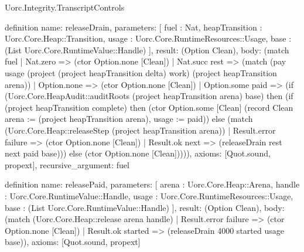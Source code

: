 \begin{lexlean}{Uorc.Integrity.TranscriptControls}
\begin{semanticmodule}
definition{
  name: releaseDrain,
  parameters: [
    fuel : Nat,
    heapTransition : Uorc.Core.Heap::Transition,
    usage : Uorc.Core.RuntimeResources::Usage,
    base : (List Uorc.Core.RuntimeValue::Handle)
  ],
  result: (Option Clean),
  body: (match fuel
    | Nat.zero => (ctor Option.none [Clean])
    | Nat.succ rest => (match (pay usage (project (project heapTransition delta) work) (project heapTransition arena))
      | Option.none => (ctor Option.none [Clean])
      | Option.some paid => (if (Uorc.Core.HeapAudit::auditRoots (project heapTransition arena) base) then (if (project heapTransition complete) then (ctor Option.some [Clean] (record Clean {arena := (project heapTransition arena), usage := paid})) else (match (Uorc.Core.Heap::releaseStep (project heapTransition arena))
        | Result.error failure => (ctor Option.none [Clean])
        | Result.ok next => (releaseDrain rest next paid base))) else (ctor Option.none [Clean])))),
  axioms: [Quot.sound, propext],
  recursive_argument: fuel
}

definition{
  name: releasePaid,
  parameters: [
    arena : Uorc.Core.Heap::Arena,
    handle : Uorc.Core.RuntimeValue::Handle,
    usage : Uorc.Core.RuntimeResources::Usage,
    base : (List Uorc.Core.RuntimeValue::Handle)
  ],
  result: (Option Clean),
  body: (match (Uorc.Core.Heap::release arena handle)
    | Result.error failure => (ctor Option.none [Clean])
    | Result.ok started => (releaseDrain 4000 started usage base)),
  axioms: [Quot.sound, propext]
}


\end{semanticmodule}
\end{lexlean}
